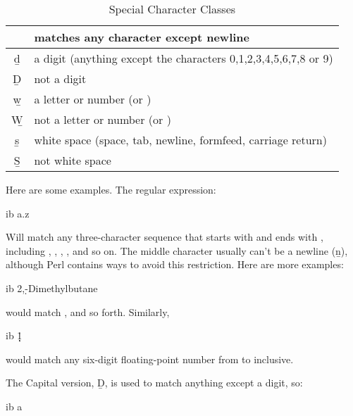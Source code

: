 \documentclass{dods-book}
\begin{document}
\begin{table}[h]
  \begin{center}
    \begin{tabular}[c]{|c|l|} \hline
      \lit{.} & matches any character except newline \\ \hline
      \b{d} & a digit (anything except the characters
      0,1,2,3,4,5,6,7,8 or 9)\\ \hline
      \b{D} & not a digit \\ \hline
      \b{w} & a letter or number (or \lit{\_})\\ \hline
      \b{W} & not a letter or number (or \lit{\_})\\ \hline
      \b{s} & white space (space, tab, newline, formfeed, carriage
      return) \\ \hline
      \b{S} & not white space\\ \hline
    \end{tabular}
    \caption{Special Character Classes}
    \label{tab:class-abbrevs}
  \end{center}
\end{table}

Here are some examples.  The regular expression:

\begin{vcode}{ib}
a.z  
\end{vcode}

Will match any three-character sequence that starts with  and
ends with , including , , ,
, and so on.  The middle character usually can't be a newline
(\b{n}), although Perl contains ways to avoid this restriction.  Here
are more examples:

\begin{vcode}{ib}
2,\d-Dimethylbutane
\end{vcode}

would match ,  and so forth.
Similarly,

\begin{vcode}{ib}
1\.\d\d\d\d\d  
\end{vcode}

would match any six-digit floating-point number from  to
 inclusive.

The Capital version, \b{D}, is used to match anything except a digit,
so:

\begin{vcode}{ib}
a\Dz  
\end{vcode}
\end{document}
